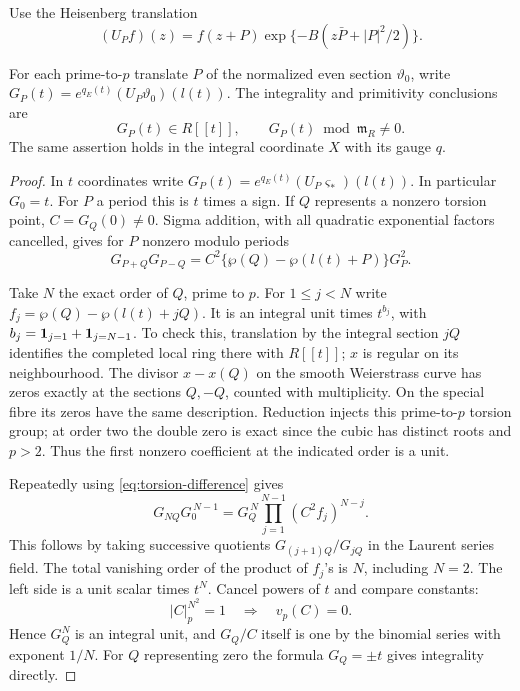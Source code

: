Use the Heisenberg translation
\[
 (U_P f)(z)=f(z+P)\exp\{-B(z\bar P+|P|^2/2)\}.
\]
\begin{proposition}\label{prop:good-cm-torsion-translates}
For each prime-to-\(p\) translate \(P\) of the normalized even
section \(\vartheta_0\), write \(G_P(t)=e^{q_E(t)}(U_P\vartheta_0)(l(t))\). The integrality and primitivity conclusions are
\[
 G_P(t)\in R[\![t]\!],\qquad G_P(t)\bmod\mathfrak m_R\ne0.
\]
 The same assertion holds in the
integral coordinate \(X\) with its gauge \(q\).
\end{proposition}

\begin{proof}

In \(t\) coordinates write \(G_P(t)=e^{q_E(t)}
 (U_P\varsigma_*)(l(t))\). In particular \(G_0=t\).
For \(P\) a period this is \(t\) times a sign. If \(Q\)
represents a nonzero torsion point, \(C=G_Q(0)\ne0\).
Sigma addition, with all quadratic exponential factors
cancelled, gives for \(P\) nonzero modulo periods
\begin{equation}\label{eq:torsion-difference}
      G_{P+Q}G_{P-Q}
            = C^2\{\wp(Q)-\wp(l(t)+P)\}G_P^2 .
\end{equation}

Take \(N\) the exact order of \(Q\), prime to \(p\). For
\(1\le j<N\) write \(f_j=\wp(Q)-\wp(l(t)+jQ)\).
It is an integral unit times \(t^{b_j}\), with
\(b_j={\bf1}_{j=1}+{\bf1}_{j=N-1}\). To check this, translation
by the integral section \(jQ\) identifies the completed local
ring there with \(R[[t]]\); \(x\) is regular on its neighbourhood.
The divisor \(x-x(Q)\) on the smooth Weierstrass curve has
zeros exactly at the sections \(Q,-Q\), counted with
multiplicity. On the special fibre its zeros have the same
description. Reduction injects this prime-to-\(p\) torsion
group; at order two the double zero is exact since the cubic
has distinct roots and \(p>2\). Thus the first nonzero
coefficient at the indicated order is a unit.


Repeatedly using \eqref{eq:torsion-difference} gives
\[
 G_{NQ} G_0^{\,N-1}
       =G_Q^{\,N}\prod_{j=1}^{N-1}(C^2 f_j)^{N-j}.
\]
This follows by taking successive quotients \(G_{(j+1)Q}/G_{jQ}\)
in the Laurent series field. The total vanishing order of the
product of \(f_j\)'s is \(N\), including \(N=2\). The left side
is a unit scalar times \(t^N\). Cancel powers of \(t\) and
compare constants: 
\[
  |C|_p^{N^2}=1\quad\Longrightarrow\quad v_p(C)=0.
\]
 Hence \(G_Q^N\) is
an integral unit, and \(G_Q/C\) itself is one by the binomial
series with exponent \(1/N\). For \(Q\) representing zero the
formula \(G_Q=\pm t\) gives integrality directly.


\end{proof}
